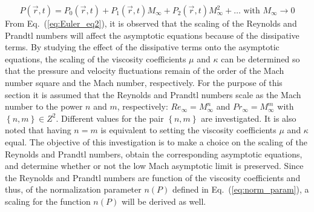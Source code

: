\documentclass[preprint,10pt]{elsarticle}
\newcommand{\eqt}[1]{Eq.~(\ref{#1})}                     %
\begin{document}
\begin{equation}
\label{eq:expansion}
P(\vec{r}, t) = P_0(\vec{r}, t) + P_1(\vec{r}, t) M_{\infty} + P_2(\vec{r}, t) M_{\infty}^2 + \dots \text{ with } M_{\infty} \to 0
\end{equation}
From \eqt{eq:Euler_eq2}, it is observed that the scaling of the Reynolds and Prandtl numbers will affect the asymptotic equations because of the dissipative terms. By studying the effect of the dissipative terms onto the asymptotic equations, the scaling of the viscosity coefficients $\mu$ and $\kappa$ can be determined so that the pressure and velocity fluctuations remain of the order of the Mach number square and the Mach number, respectively. For the purpose of this section it is assumed that the Reynolds and Prandtl numbers scale as the Mach number to the power $n$ and $m$, respectively: $Re_{\infty} = M_{\infty}^n$ and $Pr_{\infty} = M_{\infty}^m$ with $\left\{ n,m \right\} \in Z^2$. Different values for the pair $\left\{ n,m \right\}$ are investigated. It is also noted that having $n=m$ is equivalent to setting the viscosity coefficients $\mu$ and $\kappa$ equal. The objective of this investigation is to make a choice on the scaling of the Reynolds and Prandtl numbers, obtain the corresponding asymptotic equations, and determine whether or not the low Mach asymptotic limit is preserved. Since the Reynolds and Prandtl numbers are function of the viscosity coefficients and thus, of the normalization parameter $n(P)$ defined in \eqt{eq:norm_param}, a scaling for the function $n(P)$ will be derived as well. 
\end{document}
